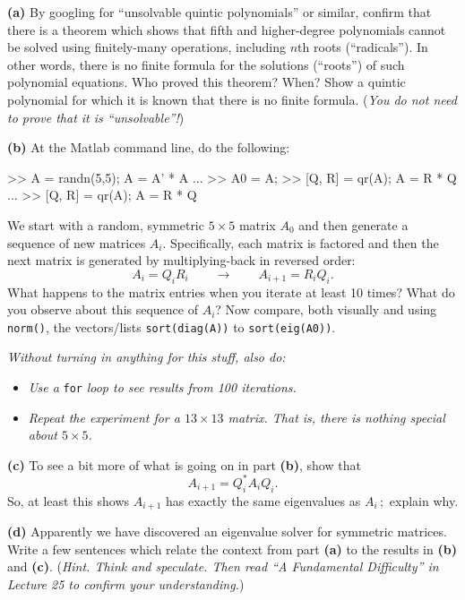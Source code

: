 \documentclass[12pt,dvipsnames]{amsart}
\newcommand{\epart}[1]{\medskip\noindent\textbf{(#1)}\quad }
\begin{document}
\epart{a} By googling for ``unsolvable quintic polynomials'' or similar, confirm that there is a theorem which shows that fifth and higher-degree polynomials cannot be solved using finitely-many operations, including $n$th roots (``radicals'').  In other words, there is no finite formula for the solutions (``roots'') of such polynomial equations.  Who proved this theorem?  When?  Show a quintic polynomial for which it is known that there is no finite formula.  (\emph{You do \emph{not} need to prove that it is ``unsolvable''!})

\epart{b} At the Matlab command line, do the following:
\begin{mVerb}
>> A = randn(5,5);  A = A' * A     %
...
>> A0 = A;                         %
>> [Q, R] = qr(A);  A = R * Q
...                                %
>> [Q, R] = qr(A);  A = R * Q
\end{mVerb}
We start with a random, symmetric $5\times 5$ matrix $A_0$ and then generate a sequence of new matrices $A_i$.  Specifically, each matrix is factored and then the next matrix is generated by multiplying-back in reversed order:
    $$A_i = Q_i R_i \qquad \longrightarrow \qquad A_{i+1} = R_i Q_i.$$
What happens to the matrix entries when you iterate at least 10 times?    What do you observe about this sequence of $A_i$?  Now compare, both visually and using \texttt{norm()}, the vectors/lists \verb|sort(diag(A))| to \verb|sort(eig(A0))|.

\medskip
\noindent \emph{Without turning in anything for this stuff, also do:}
\begin{itemize}
\item \emph{Use a} \texttt{for} \emph{loop to see results from 100 iterations.}
\item \emph{Repeat the experiment for a $13\times 13$ matrix.  That is, there is nothing special about $5\times 5$.}
\end{itemize} 

\epart{c} To see a bit more of what is going on in part \textbf{(b)}, show that
    $$A_{i+1} = Q_i^* A_i Q_i.$$
So, at least this shows $A_{i+1}$ has exactly the same eigenvalues as $A_i$\,; \,explain why.

\epart{d} Apparently we have discovered an eigenvalue solver for symmetric matrices.  Write a few sentences which relate the context from part \textbf{(a)} to the results in \textbf{(b)} and \textbf{(c)}.  (\emph{Hint.  Think and speculate.  Then read ``A Fundamental Difficulty'' in Lecture 25 to confirm your understanding.})
\end{document}
